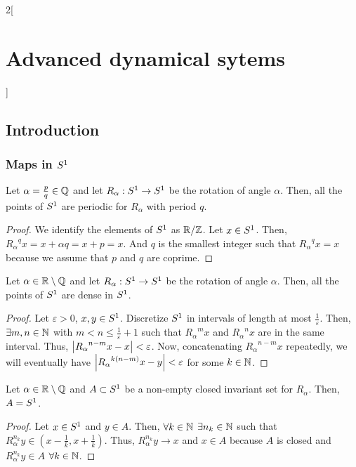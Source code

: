 \documentclass[../../../main_math.tex]{subfiles}
\begin{document}
\begin{multicols}{2}[\section{Advanced dynamical sytems}]
  \subsection{Introduction}
  \subsubsection{Maps in \texorpdfstring{$\S^1$}{S1}}
  \begin{proposition}
    Let $\alpha=\frac{p}{q}\in\QQ$ and let $R_\alpha:\S^1\to \S^1$ be the rotation of angle $\alpha$. Then, all the points of $\S^1$ are periodic for $R_\alpha$ with period $q$.
  \end{proposition}
  \begin{proof}
    We identify the elements of $\S^1$ as $\quot{\RR}{\ZZ}$. Let $x\in \S^1$. Then, ${R_\alpha}^q x=x+\alpha q=x+p=x$. And $q$ is the smallest integer such that ${R_\alpha}^q x=x$ because we assume that $p$ and $q$ are coprime.
  \end{proof}
  \begin{proposition}
    Let $\alpha\in\RR\setminus\QQ$ and let $R_\alpha:\S^1\to \S^1$ be the rotation of angle $\alpha$. Then, all the points of $\S^1$ are dense in $\S^1$.
  \end{proposition}
  \begin{proof}
    Let $\varepsilon>0$, $x,y\in \S^1$. Discretize $\S^1$ in intervals of length at most $\frac{1}{\varepsilon}$. Then, $\exists m,n\in \NN$ with $m< n\leq \frac{1}{\varepsilon}+1$ such that ${R_\alpha}^m x$ and ${R_\alpha}^nx$ are in the same interval. Thus, $\abs{{R_\alpha}^{n-m}x-x}<\varepsilon$. Now, concatenating ${R_\alpha}^{n-m}x$ repeatedly, we will eventually have $\abs{{R_\alpha}^{k(n-m)}x - y}<\varepsilon$ for some $k\in \NN$.
  \end{proof}
  \begin{corollary}
    Let $\alpha\in\RR\setminus\QQ$ and $A\subset \S^1$ be a non-empty closed invariant set for $R_\alpha$. Then, $A=\S^1$.
  \end{corollary}
  \begin{proof}
    Let $x\in \S^1$ and $y\in A$. Then, $\forall k\in\NN$ $\exists n_k\in\NN$ such that $R_\alpha^{n_k}y\in(x-\frac{1}{k},x+\frac{1}{k})$. Thus, $R_\alpha^{n_k}y\to x$ and $x\in A$ because $A$ is closed and $R_\alpha^{n_k}y\in A$ $\forall k\in\NN$.

\end{proof}
\end{multicols}
\end{document}
